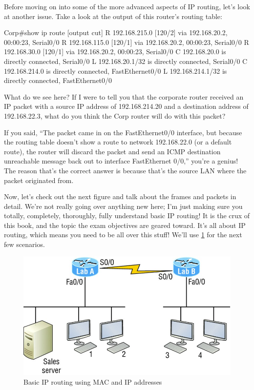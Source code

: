 Before moving on into some of the more advanced aspects of IP routing, let's look at another issue.
Take a look at the output of this router's routing table:

\begin{cli}
Corp#show ip route
[output cut]
R    192.168.215.0 [120/2] via 192.168.20.2, 00:00:23, Serial0/0
R    192.168.115.0 [120/1] via 192.168.20.2, 00:00:23, Serial0/0
R    192.168.30.0 [120/1] via 192.168.20.2, 00:00:23, Serial0/0
C    192.168.20.0 is directly connected, Serial0/0
L    192.168.20.1/32 is directly connected, Serial0/0
C    192.168.214.0 is directly connected, FastEthernet0/0
L    192.168.214.1/32 is directly connected, FastEthernet0/0
\end{cli}

What do we see here? If I were to tell you that the corporate router
received an IP packet with a source IP address of 192.168.214.20 and a
destination address of 192.168.22.3, what do you think the Corp router
will do with this packet?

If you said, ``The packet came in on the FastEthernet0/0 interface, but
because the routing table doesn't show a route to network 192.168.22.0
(or a default route), the router will discard the packet and send an
ICMP destination unreachable message back out to interface FastEthernet
0/0,'' you're a genius!
The reason that's the correct answer is because that's the source LAN where the packet originated from.

Now, let's check out the next figure and talk about the frames and
packets in detail. We're not really going over anything new here; I'm
just making sure you totally, completely, thoroughly, fully understand basic IP routing!
It is the crux of this book, and the topic the exam objectives are geared toward.
It's all about IP routing, which means you need to be all over this stuff!
We'll use \cref{fig:basic-ip-routing} for the next few scenarios.

\begin{figure}
   \centering
   \includegraphics{images/c09f006.jpg}
   \caption{Basic IP routing using MAC and IP addresses}
   \label{fig:basic-ip-routing}
\end{figure}

